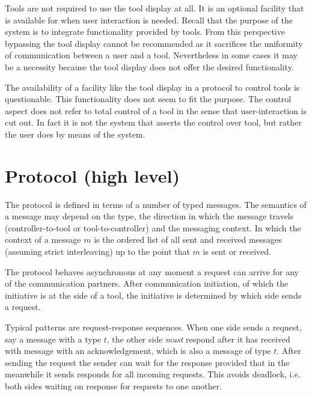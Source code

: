 \documentclass{article}
\begin{document}
   Tools are not required to use the tool display at all. It is an optional
   facility that is available for when user interaction is needed. Recall that
   the purpose of the system is to integrate functionality provided by tools.
   From this perspective bypassing the tool display cannot be recommended as it
   sacrifices the uniformity of communication between a user and a tool.
   Nevertheless in some cases it may be a necessity because the tool display
   does not offer the desired functionality.

   The availability of a facility like the tool display in a protocol to
   control tools is questionable. This functionality does not seem to fit the
   purpose. The control aspect does not refer to total control of a tool in the
   sense that user-interaction is cut out. In fact it is not the system that
   asserts the control over tool, but rather the user does by means of the system.


 \section{Protocol (high level)} \label{s:message_definitions}

  The protocol is defined in terms of a number of typed messages. The semantics
  of a message may depend on the type, the direction in which the message
  travels (controller-to-tool or tool-to-controller) and the messaging context.
  In which the context of a message $m$ is the ordered list of all sent and
  received messages (assuming strict interleaving) up to the point that $m$ is
  sent or received.

  The protocol behaves asynchronous at any moment a request can arrive for any
  of the communication partners. After communication initiation, of which the
  initiative is at the side of a tool, the initiative is determined by which
  side sends a request.

  Typical patterns are request-response sequences. When one side sends a
  request, say a message with a type $t$, the other side \emph{must} respond
  after it has received with message with an acknowledgement, which is also a
  message of type $t$. After sending the request the sender can wait for the
  response provided that in the meanwhile it sends responds for all incoming
  requests. This avoids deadlock, i.e. both sides waiting on response for
  requests to one another.
\end{document}
